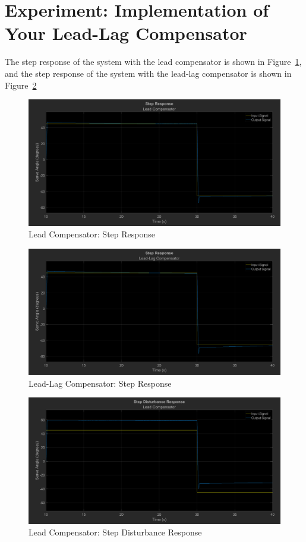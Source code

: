 \documentclass[12pt]{article}
\begin{document}
\clearpage

\section{Experiment: Implementation of Your Lead-Lag Compensator}

The step response of the system with the lead compensator is shown in Figure~\ref{fig:step_lead}, and the step response of the system with the lead-lag compensator is shown in Figure~\ref{fig:step_leadlag}

\begin{figure}[h!]
	\centering
    \includegraphics[width=\textwidth]{step_lead}
    \caption{\label{fig:step_lead}Lead Compensator: Step Response}
\end{figure}

\begin{figure}[h!]
    \centering
    \includegraphics[width=\textwidth]{step_leadlag}
    \caption{\label{fig:step_leadlag}Lead-Lag Compensator: Step Response}
\end{figure}

\begin{figure}[h!]
	\centering
    \includegraphics[width=\textwidth]{dist_lead}
    \caption{\label{fig:dist_lead}Lead Compensator: Step Disturbance Response}
\end{figure}
\end{document}

